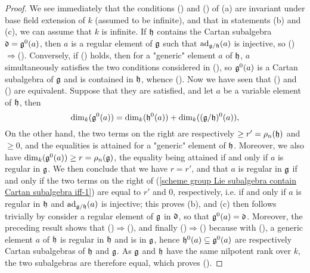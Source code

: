 \begin{proof}
We see immediately that the conditions () and () of (a) are invariant under base field extension of $k$ (assumed to be infinite), and that in statements (b) and (c), we can assume that $k$ is infinite. If $\mathfrak{h}$ contains the Cartan subalgebra $\mathfrak{d}=\mathfrak{g}^0(a)$, then $a$ is a regular element of $\mathfrak{g}$ such that $\mathrm{ad}_{\mathfrak{g}/\mathfrak{h}}(a)$ is injective, so ()$\Rightarrow$(). Conversely, if () holds, then for a "generic" element $a$ of $\mathfrak{h}$, $a$ simultaneously satisfies the two conditions considered in (), so $\mathfrak{g}^0(a)$ is a Cartan subalgebra of $\mathfrak{g}$ and is contained in $\mathfrak{h}$, whence (). Now we have seen that () and () are equivalent. Suppose that they are satisfied, and let $a$ be a variable element of $\mathfrak{h}$, then
\begin{equation}\label{scheme group Lie subalgebra contain Cartan subalgebra iff-1}
\dim_k(\mathfrak{g}^0(a))=\dim_k(\mathfrak{h}^0(a))+\dim_k((\mathfrak{g}/\mathfrak{h})^0(a)),
\end{equation}
On the other hand, the two terms on the right are respectively $\geq r'=\rho_n(\mathfrak{h})$ and $\geq 0$, and the equalities is attained for a "generic" element of $\mathfrak{h}$. Moreover, we also have $\dim_k(\mathfrak{g}^0(a))\geq r=\rho_n(\mathfrak{g})$, the equality being attained if and only if $a$ is regular in $\mathfrak{g}$. We then conclude that we have $r=r'$, and that $a$ is regular in $\mathfrak{g}$ if and only if the two terms on the right of (\ref{scheme group Lie subalgebra contain Cartan subalgebra iff-1}) are equal to $r'$ and $0$, respectively, i.e. if and only if $a$ is regular in $\mathfrak{h}$ and $\mathrm{ad}_{\mathfrak{g}/\mathfrak{h}}(a)$ is injective; this proves (b), and (c) then follows trivially by consider a regular element of $\mathfrak{g}$ in $\mathfrak{d}$, so that $\mathfrak{g}^0(a)=\mathfrak{d}$. Moreover, the preceding result shows that ()$\Rightarrow$(), and finally ()$\Rightarrow$() because with (), a generic element $a$ of $\mathfrak{h}$ is regular in $\mathfrak{h}$ and is in $\mathfrak{g}$, hence $\mathfrak{h}^0(a)\subseteq\mathfrak{g}^0(a)$ are respectively Cartan subalgebras of $\mathfrak{h}$ and $\mathfrak{g}$. As $\mathfrak{g}$ and $\mathfrak{h}$ have the same nilpotent rank over $k$, the two subalgebras are therefore equal, which proves ().
\end{proof}

